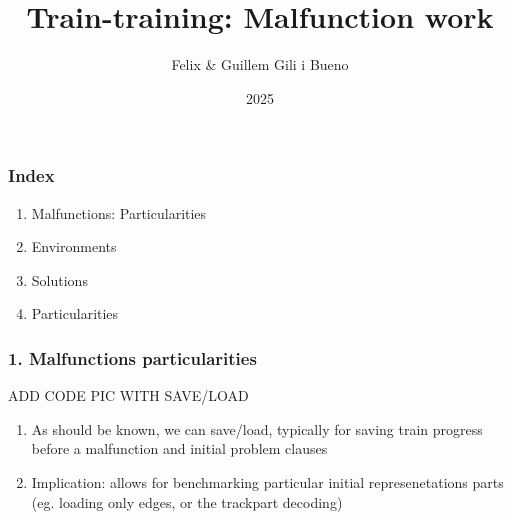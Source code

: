 \documentclass{beamer}
\title{Train-training: Malfunction work}
\author{Felix  \& Guillem Gili i Bueno  }
\institute{Potsdam University - Railway Scheudling }
\date{2025}
\begin{document}
\frame{\titlepage}

\begin{frame}
\frametitle{Index }
\begin{enumerate}
	\item{Malfunctions: Particularities } 
	\item{Environments } 
	\item{Solutions } 
	\item{Particularities } 
\end{enumerate}
\end{frame} 

\begin{frame}
	\frametitle{1.  Malfunctions particularities}
	ADD CODE PIC WITH SAVE/LOAD
\begin{enumerate}
	\item{As should be known, we can save/load, typically for saving train progress before a malfunction and initial problem clauses} 
	\item{Implication: allows for benchmarking particular initial represenetations parts (eg. loading only edges, or the trackpart decoding)} 
\end{enumerate}

\end{frame}
\end{document}
